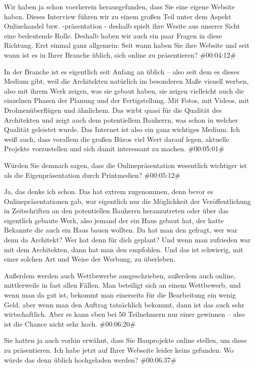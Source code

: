 \documentclass[a4paper, 12pt]{scrartcl}
\begin{document}
\begin{description}
\Fabian Wir haben ja schon voerherein herausgefunden, dass Sie eine eigene Website haben. Dieses Interview führen wir zu einem großen Teil unter dem Aspekt Onlinehandel bzw. -präsentation - deshalb spielt ihre Wesite aus unserer Sicht eine bedeutende Rolle. Deshalb haben wir auch ein paar Fragen in diese Richtung. Erst einmal ganz allgemein: Seit wann haben Sie ihre Website und seit wann ist es in Ihrer Branche üblich, sich online zu präsentieren? \#00:04:12\#

\Andre In der Branche ist es eigentlich seit Anfang an üblich – also seit dem es dieses Medium gibt, weil die Architekten natürlich im besonderen Maße visuell werben, also mit ihrem Werk zeigen, was sie gebaut haben, sie zeigen vielleicht auch die einzelnen Phasen der Planung und der Fertigstellung. Mit Fotos, mit Videos, mit Drohnenüberflügen und ähnlichem. Das wirbt quasi für die Qualität des Architekten und zeigt auch dem potentiellem Bauherrn, was schon in welcher Qualität geleistet wurde. Das Internet ist also ein ganz wichtiges Medium. Ich weiß auch, dass vorallem die großen Büros viel Wert darauf legen, aktuelle Projekte vorzustellen und sich damit interessant zu machen. \#00:05:01\#

\Toni Würden Sie demnach sagen, dass die Onlinepräsentation wesentlich wichtiger ist als die Eigenpräsentation durch Printmedien? \#00:05:12\#

\Andre Ja, das denke ich schon. Das hat extrem zugenommen, denn bevor es Onlinepräsentationen gab, war eigentlich nur die Möglichkeit der Veröffentlichung in Zeitschriften an den potentiellen Bauherrn heranzutreten oder über das eigentlich gebaute Werk, also jemand der ein Haus gebaut hat, der hatte Bekannte die auch ein Haus bauen wollten. Da hat man den gefragt, wer war denn da Architekt? Wer hat denn für dich geplant? Und wenn man zufrieden war mit dem Architekten, dann hat man den empfohlen. Und das ist schwierig, mit einer solchen Art und Weise der Werbung, zu überleben.

Außerdem werden auch Wettbewerbe ausgeschrieben, außerdem auch online, mittlerweile in fast allen Fällen. Man beteiligt sich an einem Wettbewerb, und wenn man da gut ist, bekommt man einerseits für die Bearbeitung ein wenig Geld, aber wenn man den Auftrag tatsächlich bekommt, dann ist das auch sehr wirtschaftlich. Aber es kann eben bei 50 Teilnehmern nur einer gewinnen – also ist die Chance nicht sehr hoch. \#00:06:20\#

\Fabian Sie hatten ja auch vorhin erwähnt, dass Sie Bauprojekte online stellen, um diese zu präsentieren. Ich habe jetzt auf Ihrer Webseite leider keins gefunden. Wo würde das denn üblich hochgeladen werden? \#00:06:37\#


\end{description}
\end{document}
